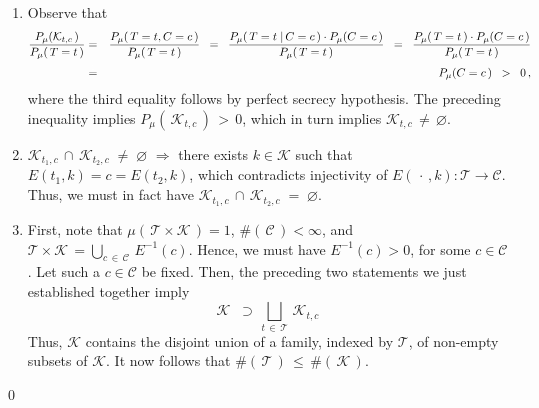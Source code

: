 \proof
\begin{enumerate}
\item
	Observe that
	\begin{eqnarray*}
	\dfrac{
		P_{\mu}\!\left(\mathcal{K}_{t,c}\,\right)
		}{
		P_{\mu}\!\left(\,T = t\,\right)
		}
	& = &
		\dfrac{
			P_{\mu}\!\left(\,T = t, C = c\,\right)
			}{
			P_{\mu}\!\left(\,T = t\,\right)
			}
		\;\; = \;\;
		\dfrac{
			P_{\mu}\!\left(\,T = t \;\vert\, C = c\,\right) \cdot P_{\mu}\!\left(C=c\,\right)
			}{
			P_{\mu}\!\left(\,T = t\,\right)
			}
		\;\; = \;\;
		\dfrac{
			P_{\mu}\!\left(\,T = t \,\right) \cdot P_{\mu}\!\left(C=c\,\right)
			}{
			P_{\mu}\!\left(\,T = t\,\right)
			}
	\\
	& \overset{{\color{white}1}}{=} &
		P_{\mu}\!\left(C = c\,\right)
		\;\; > \;\; 0\,,
	\end{eqnarray*}
	where the third equality follows by perfect secrecy hypothesis.
	The preceding inequality implies $P_{\mu}\!\left(\,\mathcal{K}_{t,c}\,\right) \,>\, 0$,
	which in turn implies $\mathcal{K}_{t,c} \,\neq\, \varnothing$.
\item
	$\mathcal{K}_{t_{1},c} \,\cap\, \mathcal{K}_{t_{2},c} \; \neq \; \varnothing$
	\;$\Longrightarrow$\;
	there exists $k \in \mathcal{K}$ such that $E(t_{1},k) = c = E(t_{2},k)$,
	which contradicts injectivity of
	$E(\,\cdot\,,k) : \mathcal{T} \longrightarrow \mathcal{C}$.
	Thus, we must in fact have
	$\mathcal{K}_{t_{1},c} \,\cap\, \mathcal{K}_{t_{2},c} \; = \; \varnothing$.
\item
	First, note that
	$\mu(\,\mathcal{T} \times \mathcal{K}\,) = 1$,
	$\#\!\left(\,\mathcal{C}\,\right) < \infty$, and
	$\mathcal{T} \times \mathcal{K} \, = \underset{c\,\in\,\mathcal{C}}{\bigcup}\,E^{-1}(c)$.
	Hence, we must have $E^{-1}(c) > 0$, for some $c \in \mathcal{C}$.
	Let such a $c \in \mathcal{C}$ be fixed.
	Then, the preceding two statements we just established together imply
	\begin{equation*}
	\mathcal{K}
	\;\; \supset \,
		\underset{t\,\in\,\mathcal{T}}{\bigsqcup}\, \mathcal{K}_{t,c}
	\end{equation*}
	Thus, $\mathcal{K}$ contains the disjoint union of a family, indexed by $\mathcal{T}$,
	of non-empty subsets of $\mathcal{K}$.
	It now follows that $\#\!\left(\,\mathcal{T}\,\right) \,\leq\, \#\!\left(\,\mathcal{K}\,\right)$.
\end{enumerate}
\qed


